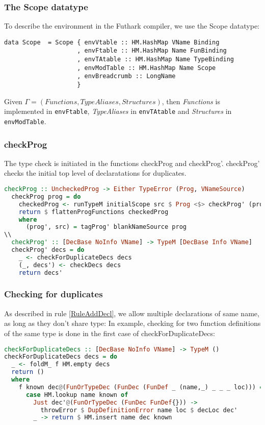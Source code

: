 \subsubsection{The Scope datatype}
To describe the environment in the Futhark compiler, we use the Scope datatype:
\begin{verbatim}
data Scope  = Scope { envVtable :: HM.HashMap VName Binding
                    , envFtable :: HM.HashMap Name FunBinding
                    , envTAtable :: HM.HashMap Name TypeBinding
                    , envModTable :: HM.HashMap Name Scope
                    , envBreadcrumb :: LongName
                    }
\end{verbatim}
Given $\Gamma = (Functions, TypeAliases, Structures)$, then \textit{Functions} is
implemented in \texttt{envFtable}, \textit{TypeAliases} in \texttt{envTAtable} and \textit{Structures} in \texttt{envModTable}.
\subsubsection{checkProg}
The type check is initiated in the functions checkProg and checkProg'.
checkProg' checks the initial top level of declaratations for duplicates.
\begin{lstlisting}[language=Haskell]
  checkProg :: UncheckedProg -> Either TypeError (Prog, VNameSource)
  checkProg prog = do
    checkedProg <- runTypeM initialScope src $ Prog <$> checkProg' (progDecs prog')
    return $ flattenProgFunctions checkedProg
    where
      (prog', src) = tagProg' blankNameSource prog
\\  
  checkProg' :: [DecBase NoInfo VName] -> TypeM [DecBase Info VName]
  checkProg' decs = do
    _ <- checkForDuplicateDecs decs
    (_, decs') <- checkDecs decs
    return decs'
\end{lstlisting}
\subsubsection{Checking for duplicates}
\label{subsec:checkingforduplicates}
As described in rule \ref{RuleAddDecl}, we allow multiple declarations of same name,
as long as they don't share type:
In example, checking for two function definitions of the same type is done in
the first case of checkForDuplicateDecs:
\begin{lstlisting}[language=Haskell]
checkForDuplicateDecs :: [DecBase NoInfo VName] -> TypeM ()
checkForDuplicateDecs decs = do
  _ <- foldM_ f HM.empty decs
  return ()
  where
    f known dec@(FunOrTypeDec (FunDec (FunDef _ (name,_) _ _ _ loc))) =
      case HM.lookup name known of
        Just dec'@(FunOrTypeDec (FunDec FunDef{})) ->
          throwError $ DupDefinitionError name loc $ decLoc dec'
        _ -> return $ HM.insert name dec known
\end{lstlisting}
